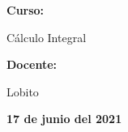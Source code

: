 \documentclass[12pt]{article}
\begin{document}
\begin{titlepage}
\begin{center}
            \vspace{1cm}
            {\bf \Large Curso:} \par 
            \vspace{2mm}
            {\Large Cálculo Integral}\par 
            \vspace{1cm}
            {\bf \Large Docente:}\par 
            \vspace{2mm}
            {\large Lobito}\par 
            \vspace{1cm}
            {\bf 17 de junio del 2021}
        \end{center}
    \end{titlepage}
\end{document}
